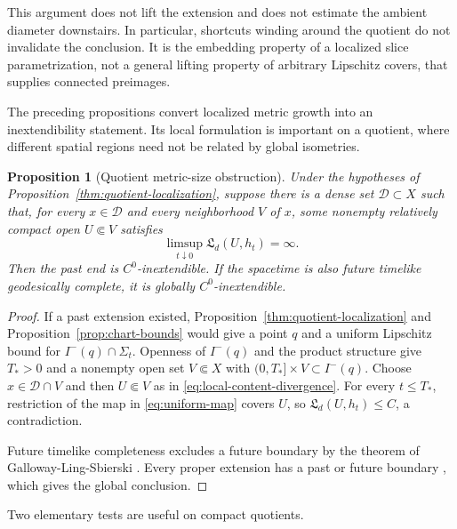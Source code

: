 \documentclass[10pt,a4paper]{article}
\numberwithin{equation}{section}
\newtheorem{proposition}[theorem]{Proposition}
\theoremstyle{definition}
\theoremstyle{remark}
\begin{document}
This argument does not lift the extension and does not estimate the
ambient diameter downstairs.  In particular, shortcuts winding around
the quotient do not invalidate the conclusion.  It is the embedding
property of a localized slice parametrization, not a general lifting
property of arbitrary Lipschitz covers, that supplies connected preimages.

The preceding propositions convert localized metric growth into an
inextendibility statement.  Its local formulation is important on a
quotient, where different spatial regions need not be related by global
isometries.

\begin{proposition}[Quotient metric-size obstruction]
\label{thm:quotient-obstruction}
Under the hypotheses of Proposition~\ref{thm:quotient-localization}, suppose
there is a dense set $\mathcal D\subset X$ such that, for every
$x\in\mathcal D$ and every neighborhood $V$ of $x$, some nonempty
relatively compact open $U\Subset V$ satisfies
\begin{equation}
 \limsup_{t\downarrow0}\mathfrak L_d(U,h_t)=\infty.
 \label{eq:local-content-divergence}
\end{equation}
Then the past end is $C^0$-inextendible.  If the spacetime is also future
timelike geodesically complete, it is globally $C^0$-inextendible.
\end{proposition}

\begin{proof}
If a past extension existed, Proposition~\ref{thm:quotient-localization} and
Proposition~\ref{prop:chart-bounds} would give a point $q$ and a uniform
Lipschitz bound for $I^-(q)\cap\Sigma_t$.  Openness of $I^-(q)$ and the
product structure give $T_*>0$ and a nonempty open set $V\Subset X$ with
$(0,T_*]\times V\subset I^-(q)$.  Choose $x\in\mathcal D\cap V$ and then
$U\Subset V$ as in \eqref{eq:local-content-divergence}.  For every
$t\le T_*$, restriction of the map in \eqref{eq:uniform-map} covers $U$, so
$\mathfrak L_d(U,h_t)\le C$, a contradiction.

Future timelike completeness excludes a future boundary by the theorem of
Galloway-Ling-Sbierski \cite{GLS2018}.  Every proper extension has a past
or future boundary \cite[Lemma~2.17]{Sbierski2018}, which gives the global conclusion.
\end{proof}

Two elementary tests are useful on compact quotients.
\end{document}
